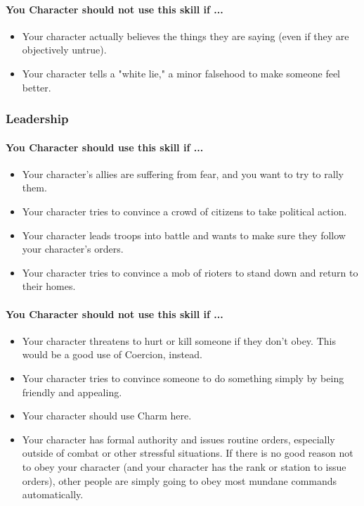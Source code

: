 \begin{multicols}{2}
\paragraph{You Character should not use this skill if ...}
\begin{itemize}
    \item Your character actually believes the things they are saying (even if
        they are objectively untrue).
    \item Your character tells a "white lie," a minor falsehood to make someone
        feel better.
\end{itemize}

\subsubsection{Leadership}\label{skill:leadership}
\paragraph{You Character should use this skill if ...}
\begin{itemize}
    \item Your character's allies are suffering from fear, and you want to try to
        rally them.
    \item Your character tries to convince a crowd of citizens to take political
        action.
    \item Your character leads troops into battle and wants to make sure they
        follow your character's orders.
    \item Your character tries to convince a mob of rioters to stand down and
        return to their homes.
\end{itemize}
\paragraph{You Character should not use this skill if ...}
\begin{itemize}
    \item Your character threatens to hurt or kill someone if they don't obey.
        This would be a good use of Coercion, instead.
    \item Your character tries to convince someone to do something simply by being
        friendly and appealing.
    \item Your character should use Charm here.
    \item Your character has formal authority and issues routine orders, especially
        outside of combat or other stressful situations. If there is no good reason
        not to obey your character (and your character has the rank or station to
        issue orders), other people are simply going to obey most mundane commands
        automatically.
\end{itemize}


\end{multicols}

